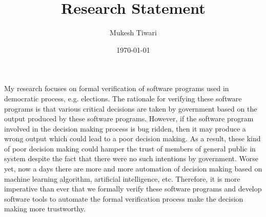 \documentclass[a4paper]{article}
\title{Research Statement}
\author{Mukesh Tiwari}
\date{\today}
\begin{document}
\fontsize{12}{15}
\selectfont
\maketitle



My research focuses on formal verification of software programs used in  democratic process, e.g. elections.  
The rationale for verifying these software programs is that various 
critical decisions are taken by government based on the output produced by these software programs. However, if the 
software program involved in the decision making process is bug ridden, then it may produce a wrong 
output which could lead to a poor decision making. As a result, these kind of poor 
decision making could hamper the trust of  members of 
general public in system despite the fact that there were no such intentions by government. 
Worse yet, now a days there are more and more automation of decision making based on machine learning algorithm, 
artificial intelligence, etc.  Therefore, it is more imperative than ever  that  we formally verify these software programs and 
develop software tools to automate the formal verification process make the decision making more trustworthy. 
\end{document}
